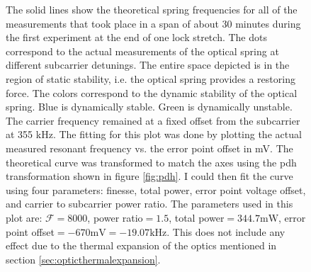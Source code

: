 \begin{figure}
  \label{fig:april_space1}
    \caption[Parameters from 1st Experiment]{
      The solid lines show the theoretical
      spring frequencies for all of the measurements that took place in a span
      of about 30 minutes during the first experiment at the end of one lock
      stretch.
      The dots correspond to the actual measurements of the optical spring at
      different subcarrier detunings. The entire space depicted is in the region
      of static stability, i.e. the optical spring provides a restoring force.
      The colors correspond to the dynamic stability of the optical spring.
      Blue is dynamically stable.
      Green is dynamically unstable.
      The carrier frequency remained at a fixed offset from the subcarrier at
      355 kHz.
      The fitting for this plot was done by plotting the actual measured
      resonant frequency vs. the error point offset in mV.
      The theoretical curve was transformed to match the axes using the
      \ac{pdh} transformation shown in figure \ref{fig:pdh}.
      I could then fit the curve using four parameters:
      finesse, total power, error point voltage offset,
      and carrier to subcarrier power ratio.
      The parameters used in this plot are:
      $\mathcal{F}=8000$, power ratio$=1.5$, total power$=344.7\mathrm{mW}$,
      error point offset$=-670\mathrm{mV}=-19.07\mathrm{kHz}$.
      This does not include any effect due to the thermal expansion of the
      optics mentioned in section \ref{sec:opticthermalexpansion}.
      }
\end{figure}

